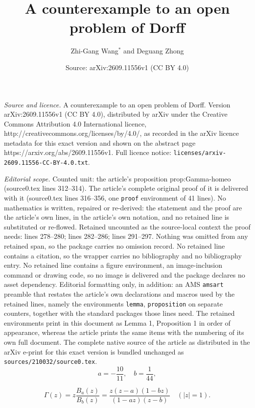 \documentclass[10pt,a4paper]{amsart}
\title{A counterexample to an open problem of Dorff}
\author{Zhi-Gang Wang$^*$ and Deguang Zhong}
\date{Source: arXiv:2609.11556v1 (CC BY 4.0)}
\begin{document}
\maketitle

\noindent\emph{Source and licence.} A counterexample to an open problem of Dorff. Version arXiv:2609.11556v1 (CC BY 4.0), distributed by arXiv under the Creative Commons Attribution 4.0 International licence, http://creativecommons.org/licenses/by/4.0/, as recorded in the arXiv licence metadata for this exact version and shown on the abstract page https://arxiv.org/abs/2609.11556v1. Full licence notice: \texttt{licenses/arxiv-2609.11556-CC-BY-4.0.txt}.\par\smallskip

\noindent\textit{Editorial scope.} Counted unit: the article's proposition prop:Gamma-homeo (source0.tex lines 312--314). The article's complete original proof of it is delivered with it (source0.tex lines 316--356, one \texttt{proof} environment of 41 lines). No mathematics is written, repaired or re-derived: the statement and the proof are the article's own lines, in the article's own notation, and no retained line is substituted or re-flowed.  Retained uncounted as the source-local context the proof needs: lines 278--280; lines 282--286; lines 291--297.  Nothing was omitted from any retained span, so the package carries no omission record.  No retained line contains a citation, so the wrapper carries no bibliography and no bibliography entry.  No retained line contains a figure environment, an image-inclusion command or drawing code, so no image is delivered and the package declares no asset dependency.  Editorial formatting only, in addition: an AMS \texttt{amsart} preamble that restates the article's own declarations and macros used by the retained lines, namely the environments \texttt{lemma}, \texttt{proposition} on separate counters, together with the standard packages those lines need.  The retained environments print in this document as Lemma 1, Proposition 1 in order of appearance, whereas the article prints the same items with the numbering of its own full document.  The complete native source of the article as distributed in the arXiv e-print for this exact version is bundled unchanged as \texttt{sources/210032/source0.tex}.
\begin{equation}\label{eq:ab}
 a=-\frac{10}{11},\quad b=\frac1{44},
\end{equation}

\begin{equation}\label{eq:Gamma}
 \Gamma(z)=z\frac{B_a(z)}{B_b(z)}
 =\frac{z(z-a)(1-bz)}{(1-az)(z-b)}
 \quad (|z|=1).
\end{equation}
\end{document}
